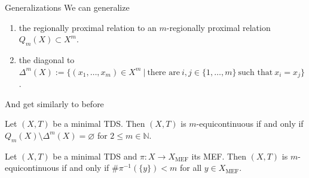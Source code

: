 \begin{frame}{Generalizations}
    We can generalize
    \begin{enumerate}
        \item the regionally proximal relation to an $m$-regionally proximal relation $Q_m(X) \subset X^{m}$.
        \item the diagonal to 
        $\Delta^m(X) := \{ (x_1, \dots, x_m) \in X^m \ | \ \text{there are} \ i, j \in \{1, \dots, m\} \ \text{such that} \ x_i = x_j \}$.
    \end{enumerate}

\end{frame}

\begin{frame}
    And get similarly to before
    \begin{theorem}
	    \label{thm:m-equiRelationChar}
	    Let $(X, T)$ be a minimal TDS.
	    Then $(X, T)$ is $m$-equicontinuous if and only if $Q_m(X) \setminus \Delta^m(X) = \varnothing$ for $2 \leq m \in \mathbb{N}$.
    \end{theorem}
    \pause
    \begin{theorem}
        Let $(X, T)$ be a minimal TDS and $\pi : X \to X_\text{MEF}$ its MEF.
        Then $(X,T)$ is $m$-equicontinuous if and only if $\# \pi^{-1}(\{ y \}) < m$ for all $y \in X_\text{MEF}$.
    \end{theorem} 
\end{frame}
